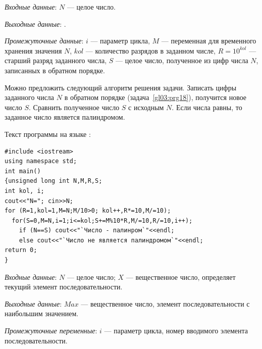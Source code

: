%

\emph{Входные данные}: $N$ --- целое число.

\emph{Выходные данные}: . 

\emph{Промежуточные данные}: $i$ --- параметр цикла, $M$ --- переменная для
временного хранения значения $N$, $kol$ --- количество разрядов в заданном числе,
$R=10^{kol}$ --- старший разряд заданного числа, $S$ --- целое число, полученное 
из цифр числа $N$, записанных в обратном порядке.

Можно предложить следующий алгоритм решения задачи. Записать цифры заданного числа $N$ в обратном
порядке (задача~\ref{gl03:prg18}), получится новое число $S$.
Сравнить полученное число $S$ с исходным $N$. Если числа равны,
то заданное число является палиндромом.

Текст программы на языке :
\begin{lstlisting}
#include <iostream>
using namespace std;
int main()
{unsigned long int N,M,R,S; 
int kol, i;
cout<<"N="; cin>>N;
for (R=1,kol=1,M=N;M/10>0; kol++,R*=10,M/=10);
  for(S=0,M=N,i=1;i<=kol;S+=M%10*R,M/=10,R/=10,i++);
    if (N==S) cout<<"`Число - палинром`"<<endl;
    else cout<<"`Число не является палиндромом`"<<endl;
return 0;
}
\end{lstlisting}



\emph{Входные данные}: $N$ --- целое число; $X$ --- вещественное число,
определяет текущий элемент последовательности.

\emph{Выходные данные}: $Max$ --- вещественное число, элемент последовательности с
наибольшим значением.

\emph{Промежуточные переменные}: $i$ --- параметр цикла, номер вводимого элемента
последовательности.


